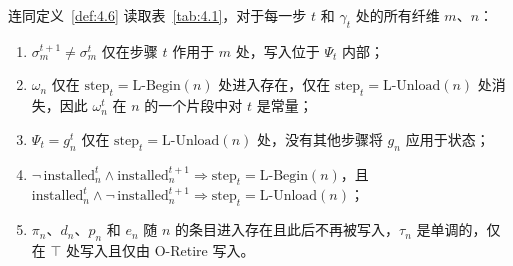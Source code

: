 \begin{lemma}\label{lem:4.1}
连同定义~\ref{def:4.6} 读取表~\ref{tab:4.1}，对于每一步 $t$ 和 $\gamma_t$ 处的所有纤维 $m$、$n$：
\begin{enumerate}
\item $\sigma^{t+1}_m \neq \sigma^t_m$ 仅在步骤 $t$ 作用于 $m$ 处，写入位于 $\Psi_t$ 内部；
\item $\omega_n$ 仅在 $\mathrm{step}_t = \text{L-Begin}(n)$ 处进入存在，仅在 $\mathrm{step}_t = \text{L-Unload}(n)$ 处消失，因此 $\omega^t_n$ 在 $n$ 的一个片段中对 $t$ 是常量；
\item $\Psi_t = g^t_n$ 仅在 $\mathrm{step}_t = \text{L-Unload}(n)$ 处，没有其他步骤将 $g_n$ 应用于状态；
\item $\lnot\,\mathrm{installed}^t_n \land \mathrm{installed}^{t+1}_n \Rightarrow \mathrm{step}_t = \text{L-Begin}(n)$，且 $\mathrm{installed}^t_n \land \lnot\,\mathrm{installed}^{t+1}_n \Rightarrow \mathrm{step}_t = \text{L-Unload}(n)$；
\item $\pi_n$、$d_n$、$p_n$ 和 $e_n$ 随 $n$ 的条目进入存在且此后不再被写入，$\tau_n$ 是单调的，仅在 $\top$ 处写入且仅由 O-Retire 写入。
\end{enumerate}
\end{lemma}

